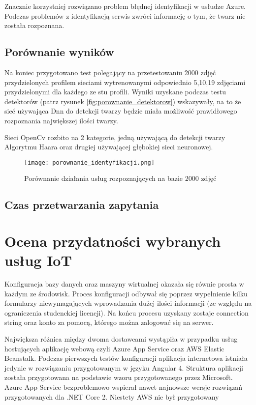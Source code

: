 Znacznie korzystniej rozwiązano problem błędnej identyfikacji w usłudze Azure. Podczas problemów z identyfikacją serwis zwróci informację o tym, że twarz nie została rozpoznana.

\subsection{Porównanie wyników}
Na koniec przygotowano test polegający na przetestowaniu 2000 zdjęć przydzielonych profilem sieciami wytrenowanymi odpowiednio 5,10,19 zdjęciami przydzielonymi dla każdego ze stu profili. Wyniki uzyskane podczas testu detektorów (patrz rysunek \ref{fig:porownanie_detektorow}) wskazywały, na to że sieć używająca Dnn do detekcji twarzy będzie miała możliwość prawidłowego rozpoznania największej ilości twarzy.

Sieci OpenCv rozbito na 2 kategorie, jedną używającą do detekcji twarzy Algorytmu Haara oraz drugiej używającej głębokiej sieci neuronowej.
\begin{figure}[H]
	\centering
	\texttt{[image: porownanie\_identyfikacji.png]}
	\caption{Porównanie działania usług rozpoznających na bazie 2000 zdjęć}
	\label{fig:porownanie_identyfikator}
\end{figure}


\subsection{Czas przetwarzania zapytania}

\section{Ocena przydatności wybranych usług IoT}



Konfiguracja bazy danych oraz maszyny wirtualnej okazała się równie prosta w każdym ze środowisk. Proces konfiguracji odbywał się poprzez wypełnienie kilku formularzy niewymagających wprowadzania dużej ilości informacji (ze względu na ograniczenia studenckiej licencji). Na końcu procesu uzyskany zostaje connection string oraz konto za pomocą, którego można zalogować się na serwer.

Największa różnica między dwoma dostawcami wystąpiła w przypadku usług hostujących aplikację webową czyli Azure App Service oraz AWS Elastic Beanstalk. Podczas pierwszych testów konfiguracji aplikacja internetowa istniała jedynie w rozwiązaniu przygotowanym w języku Angular 4. Struktura aplikacji została przygotowana na podstawie wzoru przygotowanego przez Microsoft. Azure App Service bezproblemowo wspierał nawet najnowsze wersje rozwiązań przygotowanych dla .NET Core 2. Niestety AWS nie był przygotowany 